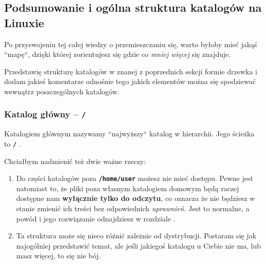 \documentclass[12pt]{article}
\newcommand{\ttbf}[1]{
    \texttt{\textbf{#1}}
}
\begin{document}
\subsection{Podsumowanie i ogólna struktura katalogów na Linuxie}

Po przyswojeniu tej całej wiedzy o przemieszczaniu się, warto byłoby mieć jakąś ``mapę``, dzięki której zorientujesz się gdzie co \emph{mniej więcej} się znajduje.

Przedstawię strukturę katalogów w znanej z poprzednich sekcji formie drzewka i dodam jakieś komentarze odnośnie tego jakich elementów można się spodziewać wewnątrz poszczególnych katalogów.

\subsubsection{Katalog główny -- \ttbf{/}}

Katalogiem głównym nazywamy ``najwyższy`` katalog w hierarchii. Jego ścieżka to \ttbf{/}.

Chciałbym nadmienić też dwie ważne rzeczy:

\begin{enumerate}
    \item Do części katalogów poza \ttbf{/home/user} możesz nie mieć dostępu. Pewne jest natomiast to, że pliki poza własnym katalogiem domowym będą raczej dostępne nam \textbf{wyłącznie tylko do odczytu}, co oznacza że nie będziesz w stanie zmienić ich treści bez odpowiednich \emph{uprawnień}. Jest to normalne, a powód i jego rozwiązanie odnajdziesz w rozdziale .
    \item Ta struktura może się nieco różnić zależnie od dystrybucji. Postaram się jak najogólniej przedstawić temat, ale jeśli jakiegoś katalogu u Ciebie nie ma, lub masz więcej, to się nie bój.
\end{enumerate}
\end{document}
